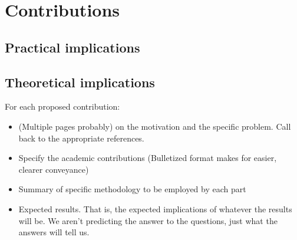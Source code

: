 \chapter{Contributions}
\section{Practical implications}
\section{Theoretical implications}

For each proposed contribution:

\begin{itemize}
    \item (Multiple pages probably) on the motivation and the specific problem. Call back to the appropriate references.
    \item Specify the academic contributions (Bulletized format makes for easier, clearer conveyance)
    \item Summary of specific methodology to be employed by each part
    \item Expected results. That is, the expected implications of whatever the results will be. We aren't predicting the answer to the questions, just what the answers will tell us.
\end{itemize}